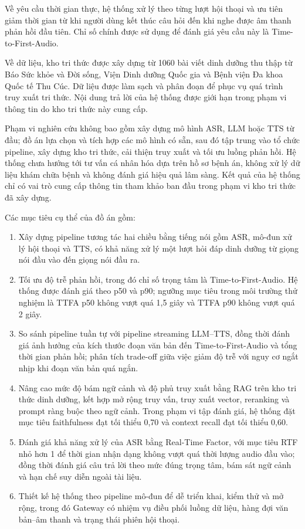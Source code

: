 \documentclass[a4paper,13pt,oneside]{report}
\begin{document}
Về yêu cầu thời gian thực, hệ thống xử lý theo từng lượt hội thoại và ưu tiên giảm thời gian từ khi người dùng kết thúc câu hỏi đến khi nghe được âm thanh phản hồi đầu tiên. Chỉ số chính được sử dụng để đánh giá yêu cầu này là Time-to-First-Audio.

Về dữ liệu, kho tri thức được xây dựng từ 1060 bài viết dinh dưỡng thu thập từ Báo Sức khỏe và Đời sống, Viện Dinh dưỡng Quốc gia và Bệnh viện Đa khoa Quốc tế Thu Cúc. Dữ liệu được làm sạch và phân đoạn để phục vụ quá trình truy xuất tri thức. Nội dung trả lời của hệ thống được giới hạn trong phạm vi thông tin do kho tri thức này cung cấp.

Phạm vi nghiên cứu không bao gồm xây dựng mô hình ASR, LLM hoặc TTS từ đầu; đồ án lựa chọn và tích hợp các mô hình có sẵn, sau đó tập trung vào tổ chức pipeline, xây dựng kho tri thức, cải thiện truy xuất và tối ưu luồng phản hồi. Hệ thống chưa hướng tới tư vấn cá nhân hóa dựa trên hồ sơ bệnh án, không xử lý dữ liệu khám chữa bệnh và không đánh giá hiệu quả lâm sàng. Kết quả của hệ thống chỉ có vai trò cung cấp thông tin tham khảo ban đầu trong phạm vi kho tri thức đã xây dựng.

Các mục tiêu cụ thể của đồ án gồm:
\begin{enumerate}[label=\arabic*)]
    \item Xây dựng pipeline tương tác hai chiều bằng tiếng nói gồm ASR, mô-đun xử lý hội thoại và TTS, có khả năng xử lý một lượt hỏi đáp dinh dưỡng từ giọng nói đầu vào đến giọng nói đầu ra.
    \item Tối ưu độ trễ phản hồi, trong đó chỉ số trọng tâm là Time-to-First-Audio. Hệ thống được đánh giá theo p50 và p90; ngưỡng mục tiêu trong môi trường thử nghiệm là TTFA p50 không vượt quá 1,5 giây và TTFA p90 không vượt quá 2 giây.
    \item So sánh pipeline tuần tự với pipeline streaming LLM--TTS, đồng thời đánh giá ảnh hưởng của kích thước đoạn văn bản đến Time-to-First-Audio và tổng thời gian phản hồi; phân tích trade-off giữa việc giảm độ trễ với nguy cơ ngắt nhịp khi đoạn văn bản quá ngắn.
    \item Nâng cao mức độ bám ngữ cảnh và độ phủ truy xuất bằng RAG trên kho tri thức dinh dưỡng, kết hợp mở rộng truy vấn, truy xuất vector, reranking và prompt ràng buộc theo ngữ cảnh. Trong phạm vi tập đánh giá, hệ thống đặt mục tiêu faithfulness đạt tối thiểu 0,70 và context recall đạt tối thiểu 0,60.
    \item Đánh giá khả năng xử lý của ASR bằng Real-Time Factor, với mục tiêu RTF nhỏ hơn 1 để thời gian nhận dạng không vượt quá thời lượng audio đầu vào; đồng thời đánh giá câu trả lời theo mức đúng trọng tâm, bám sát ngữ cảnh và hạn chế suy diễn ngoài tài liệu.
    \item Thiết kế hệ thống theo pipeline mô-đun để dễ triển khai, kiểm thử và mở rộng, trong đó Gateway có nhiệm vụ điều phối luồng dữ liệu, hàng đợi văn bản--âm thanh và trạng thái phiên hội thoại.
\end{enumerate}
\end{document}
